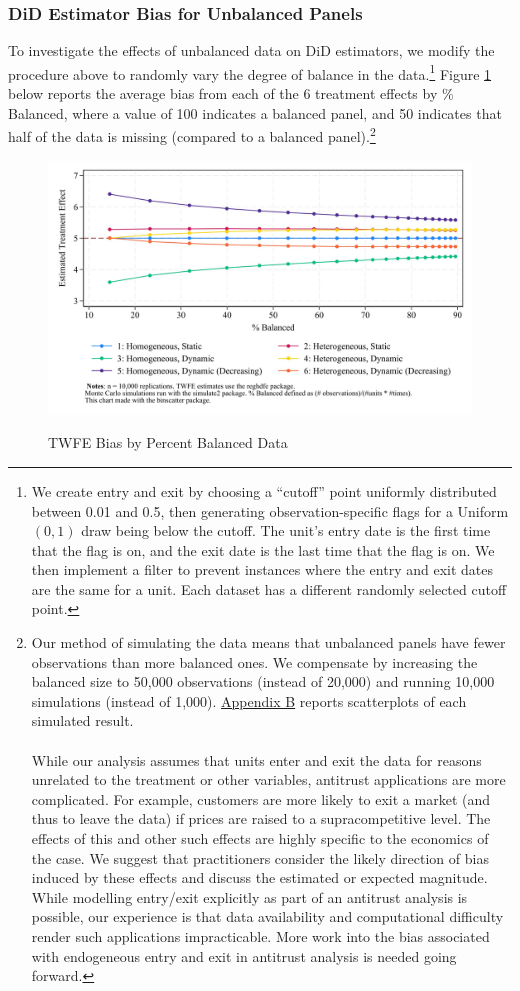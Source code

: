 \documentclass[12pt]{article}
\begin{document}
\subsubsection{DiD Estimator Bias for Unbalanced Panels}
To investigate the effects of unbalanced data on DiD estimators, we modify the procedure above to randomly  vary the degree of balance in the data.\footnote{\label{pcunbalancedfn}We create entry and exit by choosing a “cutoff” point uniformly distributed between 0.01 and 0.5, then generating observation-specific flags for a Uniform$(0,1)$ draw being below the cutoff. The unit’s entry date is the first time that the flag is on, and the exit date is the last time that the flag is on. We then implement a filter to prevent instances where the entry and exit dates are the same for a unit. Each dataset has a different randomly selected cutoff point.} Figure \ref{fig:pc-balance} below reports the average bias from each of the 6 treatment effects by \% Balanced, where a value of 100 indicates a balanced panel, and 50 indicates that half of the data is missing (compared to a balanced panel).\footnote{Our method of simulating the data means that unbalanced panels have fewer observations than more balanced ones. We compensate by increasing the balanced size to 50,000 observations (instead of 20,000) and running 10,000 simulations (instead of 1,000). \hyperref[sec:appendixb]{Appendix B} reports scatterplots of each simulated result.
\\\\
While our analysis assumes that units enter and exit the data for reasons unrelated to the treatment or other variables, antitrust applications are more complicated. For example, customers are more likely to exit a market (and thus to leave the data) if prices are raised to a supracompetitive level. The effects of this and other such effects are highly specific to the economics of the case. We suggest that practitioners consider the likely direction of bias induced by these effects and discuss the estimated or expected magnitude. While modelling entry/exit explicitly as part of an antitrust analysis is possible, our experience is that data availability and computational difficulty render such applications impracticable. More work into the bias associated with endogeneous entry and exit in antitrust analysis is needed going forward.}
\begin{figure}[H]
    \centering
    \caption{TWFE Bias by Percent Balanced Data}
    \includegraphics[width=5in]{Figures/TWFE Bias by Percent Balanced Crop.jpg}
    \label{fig:pc-balance}
\end{figure}
\end{document}
